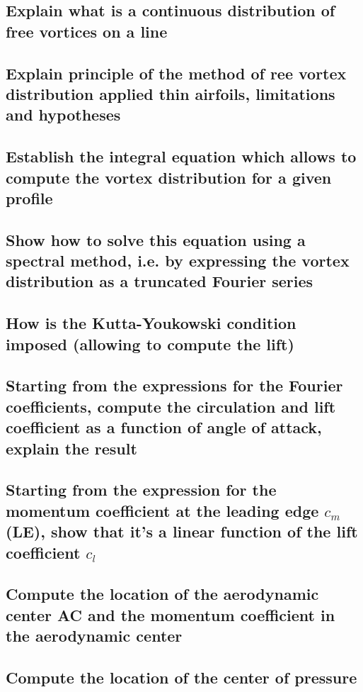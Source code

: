 \documentclass[british,french,11pt, a4paper, openany]{article}
\begin{document}
\subsection{Explain what is a continuous distribution of free vortices on a line}
\subsection{Explain principle of the method of ree vortex distribution applied thin airfoils,
	limitations and hypotheses}
\subsection{Establish the integral equation which allows to compute the vortex
	distribution for a given profile}
\subsection{Show how to solve this equation using a spectral method, i.e. by expressing
	the vortex distribution as a truncated Fourier series}
\subsection{How is the Kutta-Youkowski condition imposed (allowing to compute the lift)}
\subsection{Starting from the expressions for the Fourier coefficients, compute the
	circulation and lift coefficient as a function of angle of attack, explain the
	result}
\subsection{Starting from the expression for the momentum coefficient at the leading
	edge $c_m$(LE), show that it’s a linear function of the lift coefficient $c_l$}
\subsection{Compute the location of the aerodynamic center AC and the momentum
	coefficient in the aerodynamic center}
\subsection{Compute the location of the center of pressure}

\end{document}
